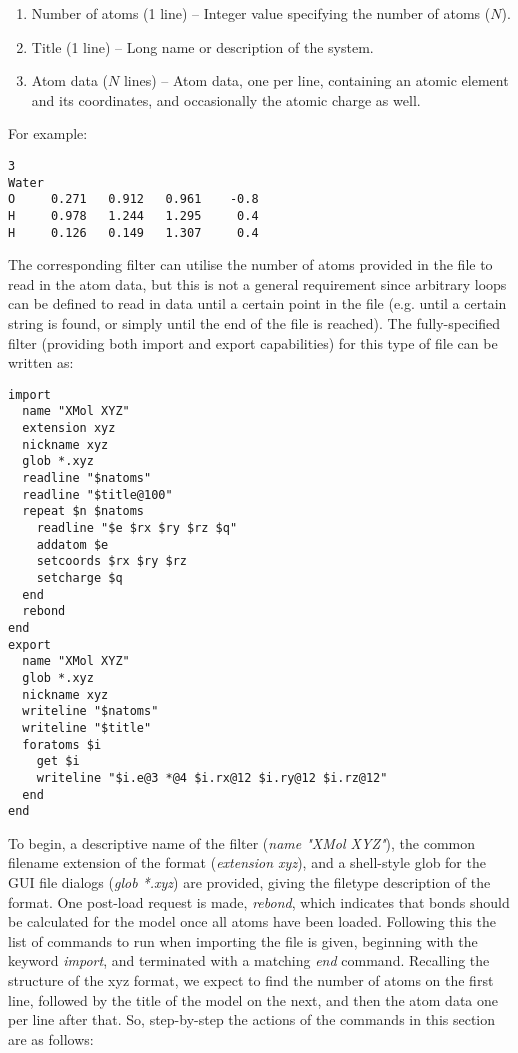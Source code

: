 \begin{enumerate}
  \item Number of atoms (1 line) -- Integer value specifying the number of atoms ($N$).
  \item Title (1 line) -- Long name or description of the system.
  \item Atom data ($N$ lines) -- Atom data, one per line, containing an atomic element and its coordinates, and occasionally the atomic charge as well.
\end{enumerate}

For example:

\begin{verbatim}
3
Water
O     0.271   0.912   0.961    -0.8
H     0.978   1.244   1.295     0.4
H     0.126   0.149   1.307     0.4
\end{verbatim}

The corresponding filter can utilise the number of atoms provided in the file to read in the atom data, but this is not a general requirement since arbitrary loops can be defined to read in data until a certain point in the file (e.g. until a certain string is found, or simply until the end of the file is reached). The fully-specified filter (providing both import and export capabilities) for this type of file can be written as:

\begin{verbatim}
import
  name "XMol XYZ"
  extension xyz
  nickname xyz
  glob *.xyz
  readline "$natoms"
  readline "$title@100"
  repeat $n $natoms
    readline "$e $rx $ry $rz $q"
    addatom $e
    setcoords $rx $ry $rz
    setcharge $q
  end
  rebond
end
export
  name "XMol XYZ"
  glob *.xyz
  nickname xyz
  writeline "$natoms"
  writeline "$title"
  foratoms $i
    get $i
    writeline "$i.e@3 *@4 $i.rx@12 $i.ry@12 $i.rz@12"
  end
end
\end{verbatim}

To begin, a descriptive name of the filter ({\it name "XMol XYZ"}), the common filename extension of the format ({\it extension xyz}), and a shell-style glob for the GUI file dialogs ({\it glob *.xyz}) are provided, giving the filetype description of the format. One post-load request is made, {\it rebond}, which indicates that bonds should be calculated for the model once all atoms have been loaded. Following this the list of commands to run when importing the file is given, beginning with the keyword {\it import}, and terminated with a matching {\it end} command. Recalling the structure of the xyz format, we expect to find the number of atoms on the first line, followed by the title of the model on the next, and then the atom data one per line after that. So, step-by-step the actions of the commands in this section are as follows:


